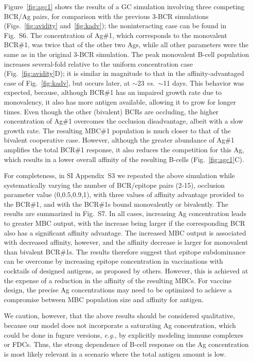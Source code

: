 \documentclass[utf8]{frontiersHLTH}%
\newcommand{\cred}[1]{\textsf{\color{red}#1}}
\newcommand{\vo}[1]{#1} %
\def\eg {{\it e.g.}}
\def\vs {{\it vs.}}
\newcommand{\fig}[1]{Fig.~\ref{fig:#1}}
\newcommand{\figs}[2]{Figs.~\ref{fig:#1} and~\ref{fig:#2}}
\newcommand{\Fig}[1]{Figure~\ref{fig:#1}}
\newcommand{\SI}{SI Appendix}
\begin{document}
%
\Fig{agc1} shows the results of a GC simulation involving three
competing BCR/Ag pairs, for comparison with the previous 3-BCR simulations (\figs{avidity}{kadv});
the noninteracting case can be found in Fig.~S6.
The concentration of
Ag\#1, which corresponds to the monovalent BCR\#1, was twice that of
the other two Ags, while all other parameters were the same as in the
original 3-BCR simulation. The peak monovalent
B-cell population increases several-fold relative to the uniform concentration
case (\fig{avidity}D); it is similar in magnitude to that in the
affinity-advantaged case of \fig{kadv}, but occurs later, at $\sim$23 \vs~$\sim$11 days. This
behavior was expected, because, although BCR\#1 has an impaired
growth rate due to monovalency, it also has more antigen available, allowing it
to grow for longer times. Even though the other (bivalent) BCRs are
occluding, the higher concentration of Ag\#1 overcomes the occlusion disadvantage,
albeit with a slow growth rate. The resulting MBC\#1 population
is much closer to that of the bivalent cooperative case.
However, although the greater abundance of Ag\#1 amplifies the total BCR\#1
response, it also reduces the competition for this Ag, which results in
a lower overall affinity of the resulting B-cells (\fig{agc1}C).

For completeness, in \SI~S3 we repeated the above simulation while systematically varying the
number of BCR/epitope pairs \vo{(2-15)}, occlusion parameter value \vo{(0,0.5,0.9,1)}, with
three values of affinity advantage provided to the
BCR\#1, and with the BCR\#1s bound monovalently or bivalently. The results are summarized in Fig.~S7.
In all cases, increasing Ag concentration leads to
greater MBC output, with the increase being larger if the
corresponding BCR also has a significant affinity advantage.
The increased MBC output is associated with decreased affinity, however, and the affinity decrease
is larger for monovalent than bivalent
BCR\#1s. The results therefore suggest that
epitope subdominance can be overcome by increasing epitope concentration
in vaccinations with cocktails of designed antigens, as proposed by
others.\cite{kanekiyo19,cohen21,glanville20}  However, this is \vo{achieved} at the expense of a
reduction in the affinity of the resulting MBCs.
For vaccine design, the precise Ag concentrations may need to be 
optimized to achieve a compromise between MBC population
size and affinity for antigen.

\cred{
We caution, however, that the above results should be considered qualitative,
because our model does not incorporate a saturating Ag concentration, which could be done 
in fugure versions, \eg, by explicitly modeling immune complexes or FDCs.
Thus, the strong dependence of B-cell response on the Ag concentration
is most likely relevant in a scenario where the total antigen amount is low.
}
\end{document}

